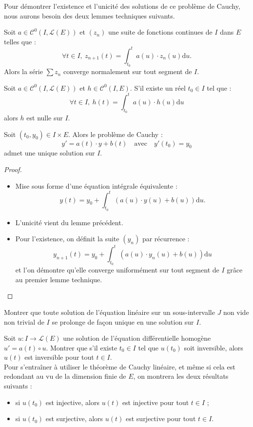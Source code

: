 \documentclass[french]{article}
\renewcommand{\d}{\text{d}}
\theoremstyle{plain}
\theoremstyle{definition}
\theoremstyle{remark}
\begin{document}
Pour démontrer l'existence et l'unicité des solutions de ce problème de Cauchy, nous aurons besoin des deux lemmes techniques suivants.

\begin{lem}%
	Soit $a\in\mathcal{C}^0(I,\mathcal{L}(E))$ et $(z_n)$ une suite de fonctions continues de $I$ dans $E$ telles que :
	$$\forall t\in I,\ z_{n+1}(t)=\int_{t_0}^{t}a(u)\cdot z_n(u)\d u.$$
	Alors la série $\displaystyle\sum z_n$ converge normalement sur tout segment de $I$.
\end{lem}

\begin{lem}%
	Soit $a\in\mathcal{C}^0(I,\mathcal{L}(E))$ et $h\in\mathcal{C}^0(I,E)$. S'il existe un réel $t_0\in I$ tel que :
	$$\forall t\in I,\ h(t)=\int_{t_0}^{t}a(u)\cdot h(u)\d u$$ alors $h$ est nulle sur $I$.
\end{lem}

\begin{thm}%
	Soit $(t_0,y_0)\in I\times E$. Alors le problème de Cauchy :
	$$y'=a(t)\cdot y+b(t)\quad\text{avec}\quad y'(t_0)=y_0$$ admet une unique solution sur $I$.
\end{thm}
\begin{proof}
	\begin{itemize}
		\item Mise sous forme d'une équation intégrale équivalente :
		$$y(t)=y_0+\int_{t_0}^{t}(a(u)\cdot y(u)+b(u))\d u.$$
		\item L'unicité vient du lemme précédent.
		\item Pour l'existence, on définit la suite $(y_n)$ par récurrence :
		$$y_{n+1}(t)=y_0+\int_{t_0}^{t}(a(u)\cdot y_n(u)+b(u))\d u$$ et l'on démontre qu'elle converge uniformément sur tout segment de $I$ grâce au premier lemme technique.
	\end{itemize}
\end{proof}

\begin{exo}[$\circ$]
	Montrer que toute solution de l'équation linéaire sur un sous-intervalle $J$ non vide non trivial de $I$ se prolonge de façon unique en une solution sur $I$.
\end{exo}

\begin{exo}[$\star$]
	Soit $u:I\to\mathcal{L}(E)$ une solution de l'équation différentielle homogène $u'=a(t)\circ u$. Montrer que s'il existe $t_0\in I$ tel que $u(t_0)$ soit inversible, alors $u(t)$ est inversible pour tout $t\in I$.\\
	Pour s'entraîner à utiliser le théorème de Cauchy linéaire, et même si cela est redondant au vu de la dimension finie de $E$, on montrera les deux résultats suivants :
	\begin{itemize}
		\item si $u(t_0)$ est injective, alors $u(t)$ est injective pour tout $t\in I$ ;
		\item si $u(t_0)$ est surjective, alors $u(t)$ est surjective pour tout $t\in I$.
	\end{itemize}
\end{exo}
\end{document}
